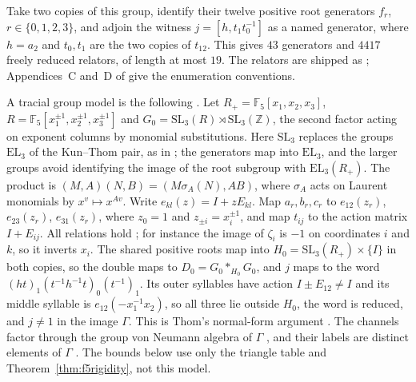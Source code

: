 \documentclass[11pt]{article}
\begin{document}
Take two copies of this group, identify their twelve positive root generators $f_r$, $r\in\{0,1,2,3\}$, and adjoin the witness $j=[h,t_1t_0^{-1}]$ as a named generator, where $h=a_2$ and $t_0,t_1$ are the two copies of $t_{12}$.  This gives $43$ generators and $4417$ freely reduced relators, of length at most $19$.  The relators are shipped as ; Appendices~C and~D of \cite{MghirbiDouglasV1} give the enumeration conventions.

A tracial group model is the following \cite[Section~2.2]{MghirbiDouglasV1}.  Let $R_+=\mathbb F_5[x_1,x_2,x_3]$, $R=\mathbb F_5[x_1^{\pm1},x_2^{\pm1},x_3^{\pm1}]$ and $G_0=\mathrm{SL}_3(R)\rtimes\mathrm{SL}_3(\mathbb Z)$, the second factor acting on exponent columns by monomial substitutions.  Here $\mathrm{SL}_3$ replaces the groups $\mathrm{EL}_3$ of the Kun--Thom pair, as in \cite{MghirbiDouglasV1}; the generators map into $\mathrm{EL}_3$, and the larger groups avoid identifying the image of the root subgroup with $\mathrm{EL}_3(R_+)$.  The product is $(M,A)(N,B)=(M\sigma_A(N),AB)$, where $\sigma_A$ acts on Laurent monomials by $x^v\mapsto x^{Av}$.  Write $e_{kl}(z)=I+zE_{kl}$.  Map $a_r,b_r,c_r$ to $e_{12}(z_r)$, $e_{23}(z_r)$, $e_{31}(z_r)$, where $z_0=1$ and $z_{\pm i}=x_i^{\pm1}$, and map $t_{ij}$ to the action matrix $I+E_{ij}$.  All relations hold \cite[Lemma~C.1]{MghirbiDouglasV1}; for instance the image of $\zeta_i$ is $-1$ on coordinates $i$ and $k$, so it inverts $x_i$.  The shared positive roots map into $H_0=\mathrm{SL}_3(R_+)\times\{I\}$ in both copies, so the double maps to $D_0=G_0*_{H_0}G_0$, and $j$ maps to the word $(ht)_1(t^{-1}h^{-1}t)_0(t^{-1})_1$.  Its outer syllables have action $I\pm E_{12}\ne I$ and its middle syllable is $e_{12}(-x_1^{-1}x_2)$, so all three lie outside $H_0$, the word is reduced, and $j\ne1$ in the image $\Gamma$.  This is Thom's normal-form argument \cite[Section~5.2]{Thom26}.  The channels factor through the group von Neumann algebra of $\Gamma$ \cite[Proposition~F.1]{MghirbiDouglasV1}, and their labels are distinct elements of $\Gamma$ \cite[Appendix~D]{MghirbiDouglasV1}.  The bounds below use only the triangle table and Theorem~\ref{thm:f5rigidity}, not this model.
\end{document}
